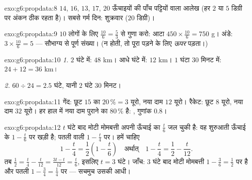 \begin{solution}{exo:g6:propdata:8}
$14$, $16$, $13$, $17$, $20$ ऊँचाइयों की पाँच पट्टियों वाला
आलेख (हर $2$ या $5$ डिग्री पर अंकन ठीक रहता है)। सबसे गर्म दिन:
शुक्रवार ($20$ डिग्री)।
\end{solution}

\begin{solution}{exo:g6:propdata:9}
$10$ लोगों के लिए $\frac{10}{6} = \frac53$ से गुणा करो: आटा
$450 \times \frac{10}{6} = 750$ g। अंडे:
$3 \times \frac{10}{6} = 5$ --- सौभाग्य से पूर्ण संख्या। (न होती,
तो पूरा पड़ने के लिए \emph{ऊपर}  पड़ता।)
\end{solution}

\begin{solution}{exo:g6:propdata:10}
\emph{1.} $2$ घंटे में: $48$ km। आधे घंटे में: $12$ km।
$1$ घंटा $30$ मिनट में: $24 + 12 = 36$ km।

\emph{2.} $60 \div 24 = 2.5$ घंटे, यानी $2$ घंटे $30$ मिनट।
\end{solution}

\begin{solution}{exo:g6:propdata:11}
गेंद: छूट $15$ का $20\,\% = 3$ यूरो, नया दाम $12$ यूरो।
रैकेट: छूट $8$ यूरो, नया दाम $32$ यूरो। हर हाल में नया दाम पुराने
का $80\,\%$ है: , गुणांक
$0.8$।
\end{solution}

\begin{solution}{exo:g6:propdata:12}
$t$ घंटे बाद मोटी मोमबत्ती अपनी ऊँचाई का $\frac t6$ जल चुकी है:
वह शुरुआती ऊँचाई के $1 - \frac t6$ पर खड़ी है; पतली वाली
$1 - \frac t4$ पर। हमें चाहिए
\[
1 - \frac t4 = \frac12 \left(1 - \frac t6\right)
\quad\text{अर्थात्}\quad
1 - \frac t4 = \frac12 - \frac t{12}.
\]
तब $\frac12 = \frac t4 - \frac t{12} = \frac{3t - t}{12} =
\frac{t}{6}$, इसलिए $t = 3$ घंटे। जाँच: $3$ घंटे बाद मोटी
मोमबत्ती $1 - \frac36 = \frac12$ पर है और पतली
$1 - \frac34 = \frac14$ पर --- सचमुच उसकी आधी।
\end{solution}

